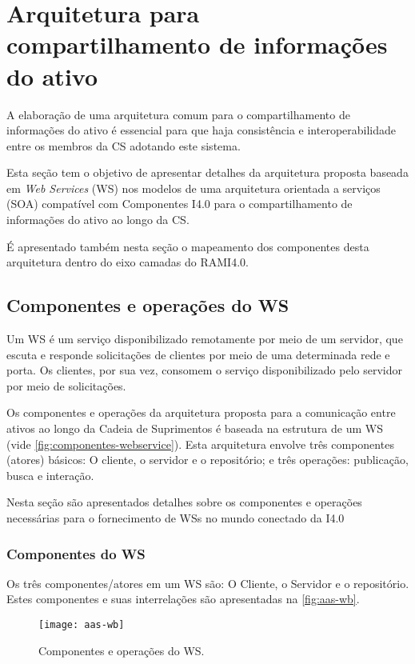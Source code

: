 \chapter{Arquitetura para compartilhamento de informações do ativo}
\label{cha:arquitetura}
	
	A elaboração de uma arquitetura comum para o compartilhamento de informações do ativo é essencial para que haja consistência e interoperabilidade entre os membros da CS adotando este sistema.
	
	Esta seção tem o objetivo de apresentar detalhes da arquitetura proposta baseada em \textit{Web Services} (WS) nos modelos de uma arquitetura orientada a serviços (SOA) compatível com Componentes I4.0 para o compartilhamento de informações do ativo ao longo da CS.
	
	É apresentado também nesta seção o mapeamento dos componentes desta arquitetura dentro do eixo camadas do RAMI4.0.
	
\section{ Componentes e operações do WS }

	Um WS é um serviço disponibilizado remotamente por meio de um servidor, que escuta e responde solicitações de clientes por meio de uma determinada rede e porta. Os clientes, por sua vez, consomem o serviço disponibilizado pelo servidor por meio de solicitações.
	
	Os componentes e operações da arquitetura proposta para a comunicação entre ativos ao longo da Cadeia de Suprimentos é baseada na estrutura de um WS (vide \autoref{fig:componentes-webservice}). Esta arquitetura envolve três componentes (atores) básicos: O cliente, o servidor e o repositório; e três operações: publicação, busca e interação. 
	
	Nesta seção são apresentados detalhes sobre os componentes e operações necessárias para o fornecimento de WSs no mundo conectado da I4.0
	
\subsection{ Componentes do WS }

	Os três componentes/atores em um WS são: O Cliente, o Servidor e o repositório. Estes componentes e suas interrelações são apresentadas na \autoref{fig:aas-wb}.
	
	\begin{figure}[htb]
		\centering
		\caption{Componentes e operações do WS.}
		\label{fig:aas-wb}
		\texttt{[image: aas-wb]}
	\end{figure}

